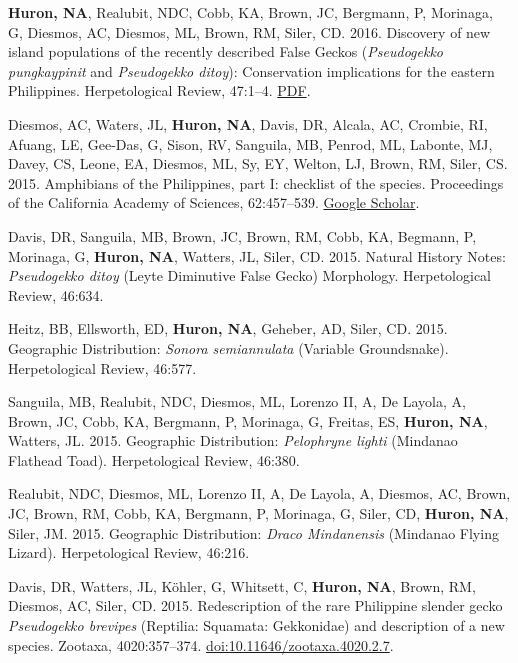 \documentclass[11pt]{article}
\begin{document}
{\begin{etaremune}[leftmargin=3.30ex, listparindent=0pt,itemindent=-1ex]
  \item \textbf{Huron, NA}, Realubit, NDC, Cobb, KA, Brown, JC, Bergmann, P, Morinaga, G, Diesmos, AC, Diesmos, ML, Brown, RM, Siler, CD. 2016. Discovery of new island populations of the recently described False Geckos (\textit{Pseudogekko pungkaypinit} and \textit{Pseudogekko ditoy}): Conservation implications for the eastern Philippines. Herpetological Review, 47:1--4. \href{https://github.com/nahuron/publication_pdfs/blob/main/2016.Huron.etal.Pseudogekko.Samar.pdf}{\color{blue}PDF}.
  \item Diesmos, AC, Waters, JL, \textbf{Huron, NA}, Davis, DR, Alcala, AC, Crombie, RI, Afuang, LE, Gee-Das, G, Sison, RV, Sanguila, MB, Penrod, ML, Labonte, MJ, Davey, CS, Leone, EA, Diesmos, ML, Sy, EY, Welton, LJ, Brown, RM, Siler, CS. 2015. Amphibians of the Philippines, part I: checklist of the species. Proceedings of the California Academy of Sciences, 62:457--539. \href{https://scholar.google.com/scholar_lookup?title=Amphibians+of+the+Philippines%2C+part+I%3A+checklist+of+the+species&author=AC+Diesmos&author=JL+Watters&author=NA+Huron&author=DR+Davis&author=AC+Alcala&author=RI+Crombie&author=LE+Afuang&author=G+Gee-Das&author=RV+Sison&author=MB+Sanguila&author=ML+Penrod&publication_year=2015}{\color{blue}Google Scholar}.
  \item Davis, DR, Sanguila, MB, Brown, JC, Brown, RM, Cobb, KA, Begmann, P, Morinaga, G, \textbf{Huron, NA}, Watters, JL, Siler, CD. 2015. Natural History Notes: \textit{Pseudogekko ditoy} (Leyte Diminutive False Gecko) Morphology. Herpetological Review, 46:634.
  \item Heitz, BB, Ellsworth, ED, \textbf{Huron, NA}, Geheber, AD, Siler, CD. 2015. Geographic Distribution: \textit{Sonora semiannulata} (Variable Groundsnake). Herpetological Review, 46:577.
  \item Sanguila, MB, Realubit, NDC, Diesmos, ML, Lorenzo II, A, De Layola, A, Brown, JC, Cobb, KA, Bergmann, P, Morinaga, G, Freitas, ES, \textbf{Huron, NA}, Watters, JL. 2015. Geographic Distribution: \textit{Pelophryne lighti} (Mindanao Flathead Toad). Herpetological Review, 46:380.
  \item Realubit, NDC, Diesmos, ML, Lorenzo II, A, De Layola, A, Diesmos, AC, Brown, JC, Brown, RM, Cobb, KA, Bergmann, P, Morinaga, G, Siler, CD, \textbf{Huron, NA}, Siler, JM. 2015. Geographic Distribution: \textit{Draco Mindanensis} (Mindanao Flying Lizard). Herpetological Review, 46:216. 
 \item Davis, DR, Watters, JL, K{\"o}hler, G, Whitsett, C, \textbf{Huron, NA}, Brown, RM, Diesmos, AC, Siler, CD. 2015. Redescription of the rare Philippine slender gecko \textit{Pseudogekko brevipes} (Reptilia: Squamata: Gekkonidae) and description of a new species. Zootaxa, 4020:357--374. \href{https://doi.org/10.11646/zootaxa.4020.2.7}{\color{blue}doi:10.11646/zootaxa.4020.2.7}.\\
\end{etaremune}}%
\end{document}
